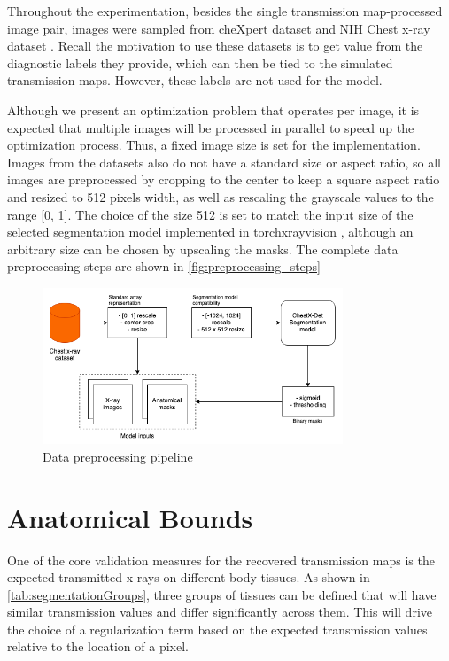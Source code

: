 \documentclass[nomenclature, english, bibtex]{kththesis}
\numberwithin{listing}{chapter}
\begin{document}
Throughout the experimentation, besides the single transmission map-processed image pair, images were sampled from
cheXpert dataset \cite{chexpert} and NIH Chest x-ray dataset \cite{nih}. Recall the motivation to use these datasets
is to get value from the diagnostic labels they provide, which can then be tied to the simulated transmission maps.
However, these labels are not used for the model.

Although we present an optimization problem that operates per image, it is expected that multiple images will
be processed in parallel to speed up the optimization process. Thus, a fixed image size is set for the implementation.
Images from the datasets also do not have a standard size or aspect ratio, so all images are preprocessed by
cropping to the center to keep a square aspect ratio and resized to 512 pixels width, as well as rescaling the
grayscale values to the range [0, 1]. The choice of the size 512 is set to match the input size of the selected
segmentation model implemented in torchxrayvision \cite{torchxrayvision}, although an arbitrary size can be chosen
by upscaling the masks. The complete data preprocessing steps are shown in \autoref{fig:preprocessing_steps}

\begin{figure}[H]
    \centering
    \includegraphics[width=0.8\textwidth]{figures/data_loading.png}
    \caption{Data preprocessing pipeline}
    \label{fig:preprocessing_steps}
\end{figure}


\section{Anatomical Bounds}


One of the core validation measures for the recovered transmission maps is the expected transmitted x-rays on
different body tissues. As shown in \autoref{tab:segmentationGroups}, three groups of tissues
can be defined that will have similar transmission values and differ significantly across them. This
will drive the choice of a regularization term based on the expected transmission values relative to
the location of a pixel.
\end{document}
